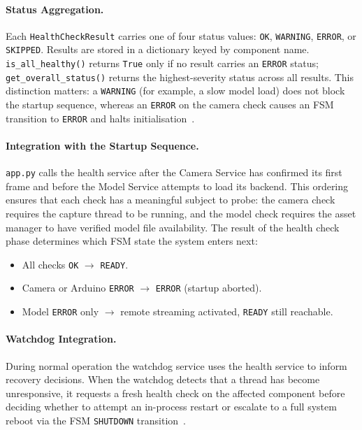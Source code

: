 \paragraph{Status Aggregation.}

Each \texttt{HealthCheckResult} carries one of four status values:
\texttt{OK}, \texttt{WARNING}, \texttt{ERROR}, or \texttt{SKIPPED}.
Results are stored in a dictionary keyed by component name.
\texttt{is\_all\_healthy()} returns \texttt{True} only if no result
carries an \texttt{ERROR} status; \texttt{get\_overall\_status()}
returns the highest-severity status across all results. This
distinction matters: a \texttt{WARNING} (for example, a slow model
load) does not block the startup sequence, whereas an \texttt{ERROR}
on the camera check causes an FSM transition to \texttt{ERROR} and
halts initialisation~\cite{kopetz2011real}.

\paragraph{Integration with the Startup Sequence.}

\texttt{app.py} calls the health service after the Camera Service
has confirmed its first frame and before the Model Service attempts
to load its backend. This ordering ensures that each check has a
meaningful subject to probe: the camera check requires the capture
thread to be running, and the model check requires the asset manager
to have verified model file availability. The result of the health
check phase determines which FSM state the system enters next:

\begin{itemize}
	\item All checks \texttt{OK} $\to$ \texttt{READY}.
	\item Camera or Arduino \texttt{ERROR} $\to$ \texttt{ERROR}
	(startup aborted).
	\item Model \texttt{ERROR} only $\to$ remote streaming activated,
	\texttt{READY} still reachable.
\end{itemize}

\paragraph{Watchdog Integration.}

During normal operation the watchdog service uses the health service
to inform recovery decisions. When the watchdog detects that a thread
has become unresponsive, it requests a fresh health check on the
affected component before deciding whether to attempt an in-process
restart or escalate to a full system reboot via the FSM
\texttt{SHUTDOWN} transition~\cite{kopetz2011real}.

